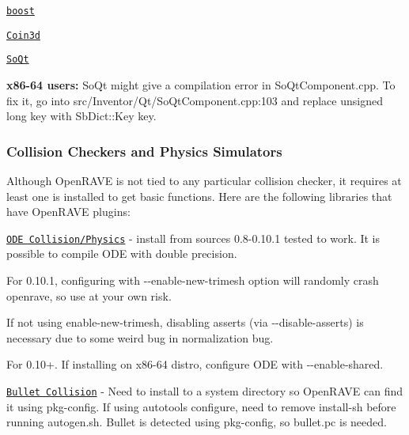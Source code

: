 \begin{DoxyItemize}
\item {\bfseries } \href{http://www.boost.org/users/download/}{\tt boost}
\item {\bfseries } \href{http://www.coin3d.org}{\tt Coin3d}
\item {\bfseries } \href{ftp://ftp.coin3d.org/pub/snapshots/SoQt-latest.tar.gz}{\tt SoQt}
\end{DoxyItemize}


\begin{DoxyItemize}
\item {\bfseries x86-\/64 users:} SoQt might give a compilation error in SoQtComponent.cpp. To fix it, go into {\ttfamily src/Inventor/Qt/SoQtComponent.cpp}:103 and replace {\ttfamily unsigned long key} with {\ttfamily SbDict::Key key}. 
\end{DoxyItemize}\hypertarget{installation__linux_ilinux_collisionphysics}{}\subsubsection{Collision Checkers and Physics Simulators}\label{installation__linux_ilinux_collisionphysics}
Although OpenRAVE is not tied to any particular collision checker, it requires at least one is installed to get basic functions. Here are the following libraries that have OpenRAVE plugins:


\begin{DoxyItemize}
\item \href{http://www.ode.org}{\tt ODE Collision/Physics} -\/ install from sources 0.8-\/0.10.1 tested to work. It is possible to compile ODE with double precision.
\begin{DoxyItemize}
\item For 0.10.1, configuring with {\ttfamily -\/-\/enable-\/new-\/trimesh} option will randomly crash openrave, so use at your own risk.
\item If not using enable-\/new-\/trimesh, disabling asserts (via {\ttfamily -\/-\/disable-\/asserts}) is necessary due to some weird bug in normalization bug.
\item For 0.10+. If installing on x86-\/64 distro, configure ODE with {\ttfamily -\/-\/enable-\/shared}.
\end{DoxyItemize}
\end{DoxyItemize}


\begin{DoxyItemize}
\item \href{http://www.bulletphysics.com}{\tt Bullet Collision} -\/ Need to install to a system directory so OpenRAVE can find it using {\ttfamily pkg-\/config}. If using autotools {\ttfamily configure}, need to remove {\ttfamily install-\/sh} before running {\ttfamily autogen.sh}. Bullet is detected using {\ttfamily pkg-\/config}, so {\ttfamily bullet.pc} is needed.
\end{DoxyItemize}


